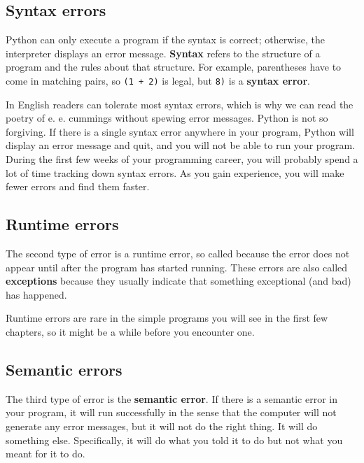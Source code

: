 \documentclass[10pt]{book}
\begin{document}
\subsection{Syntax errors}

Python can only execute a program if the syntax is
correct; otherwise, the interpreter displays an error message.
{\bf Syntax} refers to the structure of a program and the rules about
that structure.  
For example, parentheses have to come in matching pairs, so
{\tt (1 + 2)} is legal, but {\tt 8)} is a {\bf syntax error}.


In English readers can tolerate most syntax errors, which is why we
can read the poetry of e. e. cummings without spewing error messages.
Python is not so forgiving.  If there is a single syntax error
anywhere in your program, Python will display an error message and quit,
and you will not be able to run your program. During the first few
weeks of your programming career, you will probably spend a lot of
time tracking down syntax errors.  As you gain experience, you will
make fewer errors and find them faster.

\subsection{Runtime errors}
\label{runtime}

The second type of error is a runtime error, so called because the
error does not appear until after the program has started running.
These errors are also called {\bf exceptions} because they usually
indicate that something exceptional (and bad) has happened.

Runtime errors are rare in the simple programs you will see in the
first few chapters, so it might be a while before you encounter one.


\subsection{Semantic errors}

The third type of error is the {\bf semantic error}.  If there is a
semantic error in your program, it will run successfully in the sense
that the computer will not generate any error messages, but it will
not do the right thing.  It will do something else.  Specifically, it
will do what you told it to do but not what you meant for it to do.
\end{document}
